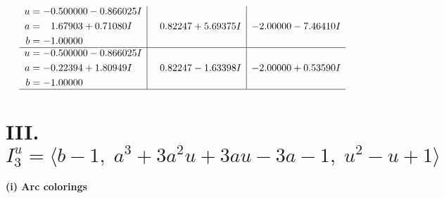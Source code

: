 \documentclass[1p]{elsarticle_modified}
\theoremstyle{definition}
\begin{document}
$$\begin{array}{c|c|c}
\begin{aligned}
u &= -0.500000 - 0.866025 I \\
a &= \phantom{-}1.67903 + 0.71080 I \\
b &= -1.00000\phantom{ +0.000000I}\end{aligned}
 & \phantom{-}0.82247 + 5.69375 I & -2.00000 - 7.46410 I \\ \hline\begin{aligned}
u &= -0.500000 - 0.866025 I \\
a &= -0.22394 + 1.80949 I \\
b &= -1.00000\phantom{ +0.000000I}\end{aligned}
 & \phantom{-}0.82247 - 1.63398 I & -2.00000 + 0.53590 I\\
 \hline 
 \end{array}$$\newpage\newpage\renewcommand{\arraystretch}{1}
\centering \section*{III. $I^u_{3}= \langle b-1,\;a^3+3 a^2 u+3 a u-3 a-1,\;u^2- u+1 \rangle$}
\flushleft \textbf{(i) Arc colorings}\\
\end{document}
